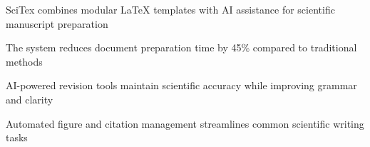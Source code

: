 
\begin{highlights}

\item SciTex combines modular LaTeX templates with AI assistance for scientific manuscript preparation

\item The system reduces document preparation time by 45\% compared to traditional methods

\item AI-powered revision tools maintain scientific accuracy while improving grammar and clarity

\item Automated figure and citation management streamlines common scientific writing tasks

\end{highlights}

